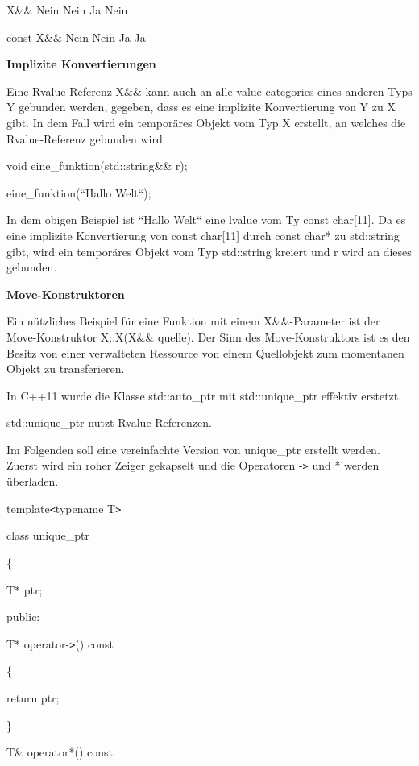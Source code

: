 \documentclass{article}
\begin{document}
X\&\&         Nein      Nein           Ja       Nein

const X\&\&   Nein      Nein           Ja       Ja

\vspace{12pt}
\textbf{Implizite Konvertierungen}

Eine Rvalue-Referenz X\&\& kann auch an alle value categories eines anderen Typs 
Y gebunden werden, gegeben, dass es eine implizite Konvertierung von Y zu X gibt. 
In dem Fall wird ein temporäres Objekt vom Typ X erstellt, an welches die Rvalue-Referenz 
gebunden wird.

void eine\_funktion(std::string\&\& r);

eine\_funktion(``Hallo Welt``);

In dem obigen Beispiel ist ``Hallo Welt`` eine lvalue vom Ty const char[11]. Da 
es eine implizite Konvertierung von const char[11] durch const char* zu std::string 
gibt, wird ein temporäres Objekt vom Typ std::string kreiert und r wird an dieses 
gebunden.

\vspace{12pt}
\textbf{Move-Konstruktoren}

Ein nützliches Beispiel für eine Funktion mit einem X\&\&-Parameter ist der Move-Konstruktor 
X::X(X\&\& quelle). Der Sinn des Move-Konstruktors ist es den Besitz von einer 
verwalteten Ressource von einem Quellobjekt zum momentanen Objekt zu transferieren.

In C++11 wurde die Klasse std::auto\_ptr mit std::unique\_ptr effektiv erstetzt.

std::unique\_ptr nutzt Rvalue-Referenzen.

Im Folgenden soll eine vereinfachte Version von unique\_ptr erstellt werden. Zuerst 
wird ein roher Zeiger gekapselt und die Operatoren -\texttt{>} und * werden überladen.

template\texttt{<}typename T\texttt{>}

class unique\_ptr

\{    

\parindent=14pt
T* ptr;

\vspace{12pt}
\parindent=0pt
public:    

\parindent=14pt
T* operator-\texttt{>}() const    

\{        

\parindent=43pt
return ptr;    

\parindent=14pt
\}    

\vspace{12pt}
T\& operator*() const    
\end{document}
